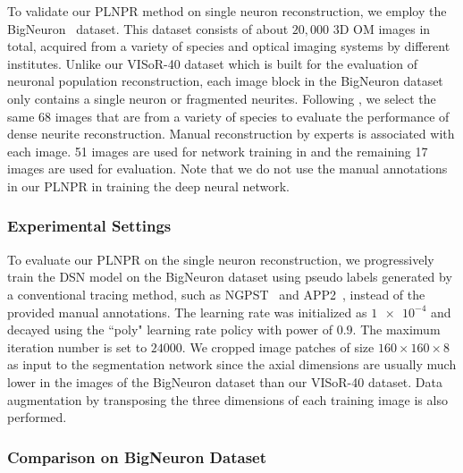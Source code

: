 To validate our PLNPR method on single neuron reconstruction, we employ the BigNeuron~\cite{peng2015} dataset.
This dataset consists of about $20,000$ 3D OM images in total, acquired from a variety of species and optical imaging systems by different institutes.
Unlike our VISoR-40 dataset which is built for the evaluation of neuronal population reconstruction, each image block in the BigNeuron dataset only contains a single neuron or fragmented neurites.
Following \cite{Li2017}, we select the same 68 images that are from a variety of species to evaluate the performance of dense neurite reconstruction.
Manual reconstruction by experts is associated with each image. 
51 images are used for network training in \cite{Li2017} and the remaining 17 images are used for evaluation.
Note that we do not use the manual annotations in our PLNPR in training the deep neural network. 


\subsubsection{Experimental Settings}
 
 
To evaluate our PLNPR on the single neuron reconstruction, we progressively train the DSN model on the BigNeuron dataset using pseudo labels generated by a conventional tracing method, such as NGPST~\cite{Quan2015} and APP2~\cite{Xiao2013}, instead of the provided manual annotations.
%
The learning rate was initialized as $\num{1e-4}$ and decayed using the ``poly" learning rate policy with power of $0.9$. The maximum iteration number is set to $ 24000 $. 
We cropped image patches of size $160\times 160\times 8$ as input to the segmentation network since the axial dimensions are usually much lower in the images of the BigNeuron dataset than our VISoR-40 dataset.
Data augmentation by transposing the three dimensions of each training image is also performed. 


\subsubsection{Comparison on BigNeuron Dataset}

